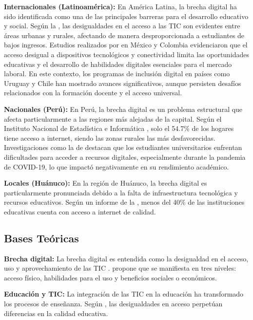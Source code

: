 \documentclass[12pt, a4paper]{article}
\begin{document}
\textbf{Internacionales (Latinoamérica):} En América Latina, la brecha digital ha sido identificada como una de las principales barreras para el desarrollo educativo y social. Según la \textcite{cepal2020}, las desigualdades en el acceso a las TIC son evidentes entre áreas urbanas y rurales, afectando de manera desproporcionada a estudiantes de bajos ingresos. Estudios realizados por \textcite{sanchez2021} en México y Colombia evidenciaron que el acceso desigual a dispositivos tecnológicos y conectividad limita las oportunidades educativas y el desarrollo de habilidades digitales esenciales para el mercado laboral. En este contexto, los programas de inclusión digital en países como Uruguay y Chile han mostrado avances significativos, aunque persisten desafíos relacionados con la formación docente y el acceso universal.


\textbf{Nacionales (Perú):} En Perú, la brecha digital es un problema estructural que afecta particularmente a las regiones más alejadas de la capital. Según el Instituto Nacional de Estadística e Informática \parencite{inei2022}, solo el 54.7\% de los hogares tiene acceso a internet, siendo las zonas rurales las más desfavorecidas. Investigaciones como la de \textcite{vasquez2021} destacan que los estudiantes universitarios enfrentan dificultades para acceder a recursos digitales, especialmente durante la pandemia de COVID-19, lo que impactó negativamente en su rendimiento académico.

\textbf{Locales (Huánuco):} En la región de Huánuco, la brecha digital es particularmente pronunciada debido a la falta de infraestructura tecnológica y recursos educativos. Según un informe de la \textcite{dreh2023}, menos del 40\% de las instituciones educativas cuenta con acceso a internet de calidad.

\subsection{Bases Teóricas}

\textbf{Brecha digital:} La brecha digital es entendida como la desigualdad en el acceso, uso y aprovechamiento de las TIC \parencite{unesco2019}. \textcite{vandijk2020} propone que se manifiesta en tres niveles: acceso físico, habilidades para el uso y beneficios sociales o económicos.

\textbf{Educación y TIC:} La integración de las TIC en la educación ha transformado los procesos de enseñanza. Según \textcite{coll2021}, las desigualdades en acceso perpetúan diferencias en la calidad educativa.
\end{document}
